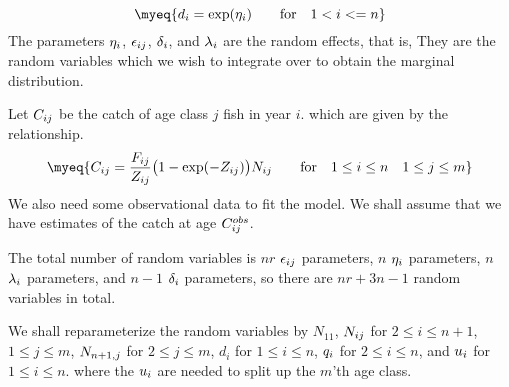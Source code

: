 \begin{equation}
 \myeq{
   \di=\exp(\etai) \qquad \hbox{for} \quad 1<i<=n
  }
    \label{nlss:xx205}
\end{equation}
The parameters $\eta_i$, $\epsilon_{ij}$, $\delta_i$, 
and $\lambda_i$ are the random effects, 
that is, They are the random variables which we wish to integrate over to
obtain the marginal distribution.

Let $C_{ij}$ be the catch of age class $j$ fish in year $i$.
which are given by the relationship.
\begin{equation}
 \myeq{
   \Cij={\Fij\over \Zij}\big(1-\exp(-\Zij)\big)\Nij
     \qquad \hbox{for} \quad 1\le i\le n \quad 1\le j\le m
  }
  \label{nlss:xx206}
\end{equation}
We also need some observational data to fit the model. We shall assume that
we have estimates of the catch at age $C^{obs}_{ij}$.

The total number of random variables is
$nr$ $\epsilon_{ij}$ parameters, $n$ $\eta_i$ parameters,
$n$ $\lambda_i$ parameters, and $n-1$ $\delta_i$ parameters,
so there are $nr+3n-1$ random variables in total.

We shall reparameterize the random variables by 
$N_{11}$, 
$N_{ij}$ for $2\le i\le n+1$, $1\le j\le m$, 
$N_{n+1,j}$ for  $2\le j\le m$, 
$d_i$ for $1\le i\le n$,
$q_i$ for $2\le i\le n$, and $u_i$ for $1\le i\le n$.
where the $u_i$ are needed to split up the $m$'th age class.



